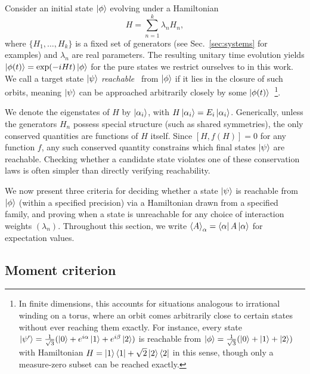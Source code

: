 \documentclass[aps,prx,reprint,superscriptaddress,footnote, twocolumn,notitlepage]{revtex4-2}
\begin{document}

Consider an initial state $\ket{\phi}$ evolving under a Hamiltonian 
\begin{equation}
    H = \sum_{n=1}^{k} \lambda_n H_n,
    \label{eq:decomposition}
\end{equation}
where $\{H_1, \ldots, H_k\}$ is a fixed set of generators (see Sec.~\ref{sec:systems} for examples) and $\lambda_n$ are real parameters. The resulting unitary time evolution yields $\ket{\phi(t)} = \exp(-iHt)\ket{\phi}$ for the pure states we restrict ourselves to in this work. We call a target state $\ket{\psi}$ \emph{reachable}~\cite{boscain_introduction_2021} from $\ket{\phi}$ if it lies in the closure of such orbits, meaning $\ket{\psi}$ can be approached arbitrarily closely by some $\ket{\phi(t)}$~\footnote{In finite dimensions, this accounts for situations analogous to irrational winding on a torus, where an orbit comes arbitrarily close to certain states without ever reaching them exactly. For instance, every state $\ket{\psi'} = \frac{1}{\sqrt{3}}(\ket{0} + e^{i\alpha}\ket{1} + e^{i\beta}\ket{2})$ is reachable from $\ket{\phi} = \frac{1}{\sqrt{3}}(\ket{0} + \ket{1} + \ket{2})$ with Hamiltonian $H = \ket{1}\bra{1} + \sqrt{2}\ket{2}\bra{2}$ in this sense, though only a measure-zero subset can be reached exactly.}.

We denote the eigenstates of $H$ by $\ket{\alpha_i}$, with $H\ket{\alpha_i} = E_i\ket{\alpha_i}$. Generically, unless the generators $H_n$ possess special structure (such as shared symmetries), the only conserved quantities are functions of $H$ itself. Since $[H, f(H)] = 0$ for any function $f$, any such conserved quantity constrains which final states $\ket{\psi}$ are reachable. Checking whether a candidate state violates one of these conservation laws is often simpler than directly verifying reachability.

We now present three criteria for deciding whether a state $\ket{\psi}$ is reachable from $\ket{\phi}$ (within a specified precision) via a Hamiltonian drawn from a specified family, and proving when a state is unreachable for any choice of interaction weights $(\lambda_n)$.
Throughout this section, we write $\braket{A}_\alpha = \bra{\alpha}A\ket{\alpha}$ for expectation values.
\subsection{Moment criterion}\label{ssec:mom}
\end{document}
